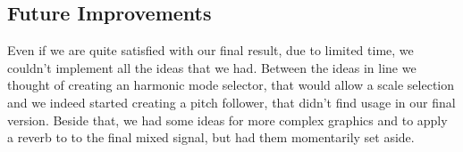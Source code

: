 \documentclass{article}
\begin{document}
\subsection{Future Improvements}
Even if we are quite satisfied with our final result, due to limited time, we couldn’t implement all the ideas that we had. Between the ideas in line we thought  of creating an harmonic mode selector, that would allow a scale selection and we indeed started creating a pitch follower, that didn’t find usage in our final version. Beside that, we had some ideas for more complex graphics and to apply a reverb to to the final mixed signal, but had them momentarily set aside.
\end{document}
